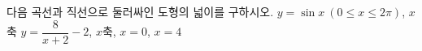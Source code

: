 다음 곡선과 직선으로 둘러싸인 도형의 넓이를 구하시오.
 $y=\sin x\ (0\le x\le 2\pi)$, $x$축
 $y=\dfrac{8}{x+2}-2$, $x$축, $x=0$, $x=4$
